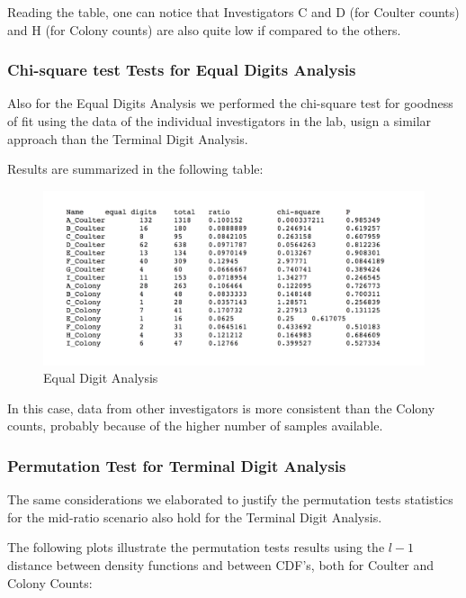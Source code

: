 \documentclass{article}
\begin{document}
Reading the table, one can notice that Investigators C and D (for
Coulter counts) and H (for Colony counts) are also quite low if compared
to the others.

    \subsubsection{Chi-square test Tests for Equal Digits
Analysis}\label{chi-square-test-tests-for-equal-digits-analysis}

Also for the Equal Digits Analysis we performed the chi-square test for
goodness of fit using the data of the individual investigators in the
lab, usign a similar approach than the Terminal Digit Analysis.

Results are summarized in the following table:

\begin{figure}[htbp]
\centering
\includegraphics{images/eq_inv_tab.png}
\caption{Equal Digit Analysis}
\end{figure}

In this case, data from other investigators is more consistent than the
Colony counts, probably because of the higher number of samples
available.

    \subsubsection{Permutation Test for Terminal Digit
Analysis}\label{permutation-test-for-terminal-digit-analysis}

The same considerations we elaborated to justify the permutation tests
statistics for the mid-ratio scenario also hold for the Terminal Digit
Analysis.

The following plots illustrate the permutation tests results using the
\(l-1\) distance between density functions and between CDF's, both for
Coulter and Colony Counts:
\end{document}
